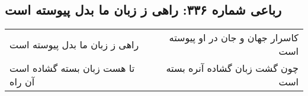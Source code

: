 \begin{center}
\section*{رباعی شماره ۳۳۶: راهی ز زبان ما بدل پیوسته است}
\label{sec:0336}
\begin{longtable}{l p{0.5cm} r}
راهی ز زبان ما بدل پیوسته است
&&
کاسرار جهان و جان در او پیوسته است
\\
تا هست زبان بسته گشاده است آن راه
&&
چون گشت زبان گشاده آنره بسته است
\\
\end{longtable}
\end{center}

